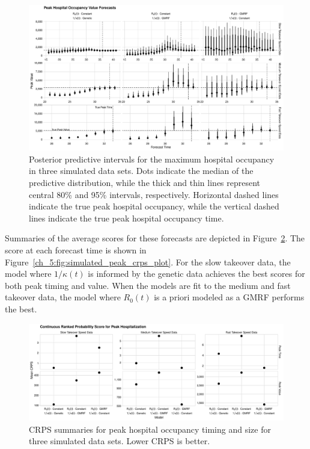 \begin{figure}
    \centering
    \includegraphics[width=1.0\columnwidth]{simulated_peak_assessment_value_plot}
    \caption[Posterior predictive intervals for peak hospital occupancy for simulated data sets.]{Posterior predictive intervals for the maximum hospital occupancy in three simulated data sets.
    Dots indicate the median of the predictive distribution, while the thick and thin lines represent central 80\% and 95\% intervals, respectively.
    Horizontal dashed lines indicate the true peak hospital occupancy, while the vertical dashed lines indicate the true peak hospital occupancy time.}
    \label{ch_5:fig:simulated_peak_assessment_value_plot}
\end{figure}

Summaries of the average scores for these forecasts are depicted in Figure~\ref{ch_5:fig:simulated_peak_crps_dotplot_plot}.
The score at each forecast time is shown in Figure~\ref{ch_5:fig:simulated_peak_crps_plot}.
For the slow takeover data, the model where \( 1 / \kappa(t) \) is informed by the genetic data achieves the best scores for both peak timing and value.
When the models are fit to the medium and fast takeover data, the model where \( R_0(t) \) is a priori modeled as a GMRF performs the best.

\begin{figure}
    \centering
    \includegraphics[width=1.0\columnwidth]{simulated_peak_crps_dotplot_plot}
    \caption[CRPS summaries for peak hospital occupancy in simulated data sets.]{CRPS summaries for peak hospital occupancy timing and size for three simulated data sets. Lower CRPS is better.}
    \label{ch_5:fig:simulated_peak_crps_dotplot_plot}
\end{figure}

